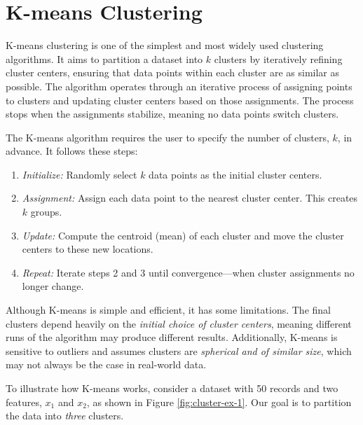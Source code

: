 \documentclass[
]{book}
\providecommand{\tightlist}{%
  \setlength{\itemsep}{0pt}\setlength{\parskip}{0pt}}
\theoremstyle{definition}
\theoremstyle{definition}
\theoremstyle{definition}
\theoremstyle{definition}
\theoremstyle{remark}
\begin{document}
\section{K-means Clustering}\label{kmeans}

K-means clustering is one of the simplest and most widely used clustering algorithms. It aims to partition a dataset into \emph{\(k\)} clusters by iteratively refining cluster centers, ensuring that data points within each cluster are as similar as possible. The algorithm operates through an iterative process of assigning points to clusters and updating cluster centers based on those assignments. The process stops when the assignments stabilize, meaning no data points switch clusters.

The K-means algorithm requires the user to specify the number of clusters, \emph{\(k\)}, in advance. It follows these steps:

\begin{enumerate}
\def\labelenumi{\arabic{enumi}.}
\tightlist
\item
  \emph{Initialize:} Randomly select \emph{\(k\)} data points as the initial cluster centers.\\
\item
  \emph{Assignment:} Assign each data point to the nearest cluster center. This creates \emph{\(k\)} groups.\\
\item
  \emph{Update:} Compute the centroid (mean) of each cluster and move the cluster centers to these new locations.\\
\item
  \emph{Repeat:} Iterate steps 2 and 3 until convergence---when cluster assignments no longer change.
\end{enumerate}

Although K-means is simple and efficient, it has some limitations. The final clusters depend heavily on the \emph{initial choice of cluster centers}, meaning different runs of the algorithm may produce different results. Additionally, K-means is sensitive to outliers and assumes clusters are \emph{spherical and of similar size}, which may not always be the case in real-world data.

To illustrate how K-means works, consider a dataset with 50 records and two features, \emph{\(x_1\)} and \emph{\(x_2\)}, as shown in Figure \ref{fig:cluster-ex-1}. Our goal is to partition the data into \emph{three} clusters.
\end{document}
